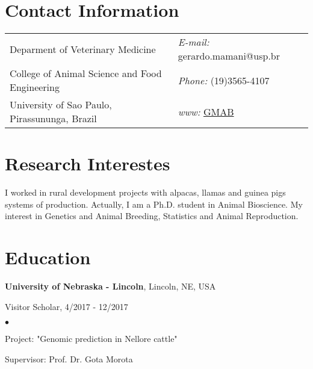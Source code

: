 \documentclass[margin,line,10pt]{res}
\newenvironment{list1}{
  \begin{list}{\ding{113}}{%
      \setlength{\itemsep}{0in}
      \setlength{\parsep}{0in} \setlength{\parskip}{0in}
      \setlength{\topsep}{0in} \setlength{\partopsep}{0in} 
      \setlength{\leftmargin}{0.17in}}}{\end{list}}
\newenvironment{list2}{
  \begin{list}{$\bullet$}{%
      \setlength{\itemsep}{0in}
      \setlength{\parsep}{0in} \setlength{\parskip}{0in}
      \setlength{\topsep}{0in} \setlength{\partopsep}{0in} 
      \setlength{\leftmargin}{0.2in}}}{\end{list}}
\begin{document}

\begin{resume}
\section{\sc Contact Information}
\vspace{.05in}
\begin{tabular}{@{}p{3in}p{4in}}
Deparment of Veterinary Medicine                & \hspace{2.2cm} {\it E-mail:} gerardo.mamani@usp.br\\       
College of Animal Science and Food Engineering  & \hspace{2.2cm} {\it Phone:} (19)3565-4107\\  
University of Sao Paulo, Pirassununga, Brazil   & \hspace{2.2cm} {\it www:} \textcolor{black}{\href{http://www.usp.br/gmab/}{GMAB} }\\  

\end{tabular}

\vspace{0.3cm}
\section{\sc Research Interestes}
I worked in rural development projects with alpacas, llamas and guinea pigs systems of production. Actually, I am a Ph.D. student in Animal Bioscience. My interest in Genetics and Animal Breeding, Statistics and Animal Reproduction. 
 
\section{\sc Education}

{\bf University of Nebraska - Lincoln}, Lincoln, NE, USA\\
\vspace*{-.1in}
\begin{list1}
\item[] Visitor Scholar, 4/2017 - 12/2017
\begin{list2}
\vspace*{.05in}
\item Project: "Genomic prediction in Nellore cattle" 
\item Supervisor: Prof. Dr. Gota Morota
\end{list2}
\vspace*{.05in}
\end{list1}


\end{resume}
\end{document}
